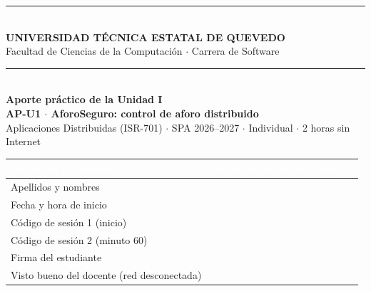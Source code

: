 \documentclass[11pt,a4paper]{article}
\newcommand{\codigo}{AP-U1}
\newcommand{\hdr}[1]{\textcolor{white}{\textbf{#1}}}
\begin{document}
\begin{center}
	{\color{uteqBlue}\rule{\linewidth}{1pt}}\\[0.2cm]
	{\large\bfseries\color{uteqBlue} UNIVERSIDAD TÉCNICA ESTATAL DE QUEVEDO}\\[0.05cm]
	{\normalsize Facultad de Ciencias de la Computación $\cdot$ Carrera de Software}\\[0.1cm]
	{\color{uteqBlue}\rule{\linewidth}{1pt}}\\[0.3cm]
	{\LARGE\bfseries\color{uteqBlue} Aporte práctico de la Unidad I}\\[0.12cm]
	{\large\bfseries \codigo{} $\cdot$ AforoSeguro: control de aforo distribuido}\\[0.08cm]
	{\normalsize Aplicaciones Distribuidas (ISR-701) $\cdot$ SPA 2026--2027 $\cdot$ Individual $\cdot$ 2 horas sin Internet}
\end{center}

\begin{xltabular}{\linewidth}{@{}L{5.2cm}Y@{}}
	\toprule
	\hdr{Datos del estudiante} & \hdr{(llenar al inicio de la sesión)} \\
	\midrule
	\endhead
	Apellidos y nombres & \\[1pt]
	Fecha y hora de inicio & \\[1pt]
	Código de sesión 1 (inicio) & \\[1pt]
	Código de sesión 2 (minuto 60) & \\[1pt]
	Firma del estudiante & \\[1pt]
	Visto bueno del docente (red desconectada) & \\[1pt]
	\bottomrule
\end{xltabular}
\end{document}
